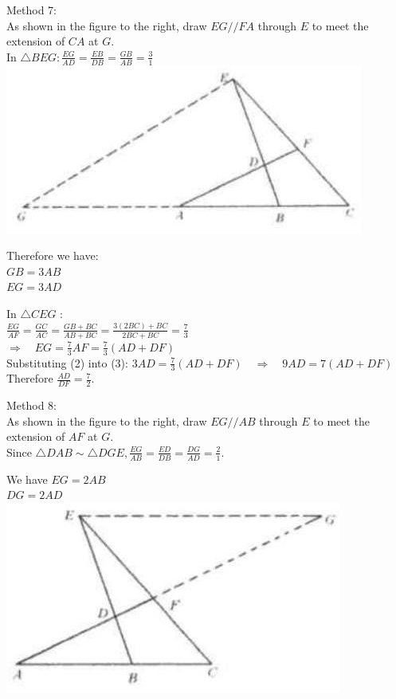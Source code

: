 \documentclass[10pt]{article}
\begin{document}
Method 7:\\
As shown in the figure to the right, draw \(E G / / F A\) through \(E\) to meet the extension of \(C A\) at \(G\).\\
In \(\triangle B E G: \frac{E G}{A D}=\frac{E B}{D B}=\frac{G B}{A B}=\frac{3}{1}\)\\
\includegraphics[max width=\textwidth, center]{2025_04_17_97bc1f7e44d93c271a88g-113(1)}

Therefore we have:\\
\(G B=3 A B\)\\
\(E G=3 A D\)


In \(\triangle C E G\) :\\
\(\frac{E G}{A F}=\frac{G C}{A C}=\frac{G B+B C}{A B+B C}=\frac{3(2 B C)+B C}{2 B C+B C}=\frac{7}{3}\)\\
\(\Rightarrow \quad E G=\frac{7}{3} A F=\frac{7}{3}(A D+D F)\)\\
Substituting (2) into (3): \(3 A D=\frac{7}{3}(A D+D F) \quad \Rightarrow \quad 9 A D=7(A D+D F)\)\\
Therefore \(\frac{A D}{D F}=\frac{7}{2}\).

Method 8:\\
As shown in the figure to the right, draw \(E G / / A B\) through \(E\) to meet the extension of \(A F\) at \(G\).\\
Since \(\triangle D A B \sim \triangle D G E, \frac{E G}{A B}=\frac{E D}{D B}=\frac{D G}{A D}=\frac{2}{1}\).

We have \(E G=2 A B\)\\
\(D G=2 A D\)\\
\includegraphics[max width=\textwidth, center]{2025_04_17_97bc1f7e44d93c271a88g-114}
\end{document}
